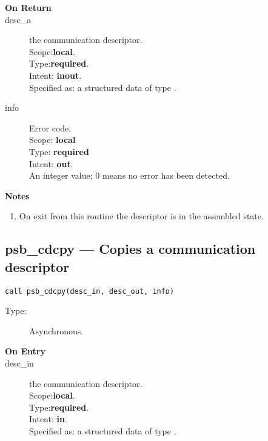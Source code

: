 \begin{description}
\item[\bf On Return]
\item[desc\_a] the communication descriptor.\\
Scope:{\bf local}.\\
Type:{\bf required}.\\
Intent: {\bf inout}.\\
Specified as: a structured data of type \descdata.
\item[info] Error code.\\
Scope: {\bf local} \\
Type: {\bf required} \\
Intent: {\bf out}.\\
An integer value; 0 means no error has been detected. 
\end{description}
{\par\noindent\large\bfseries Notes}
\begin{enumerate}
\item On exit from this routine the descriptor is in the assembled
  state. 
\end{enumerate}



%
%
\clearpage\subsection*{psb\_cdcpy --- Copies a communication descriptor}

\begin{verbatim}
call psb_cdcpy(desc_in, desc_out, info)
\end{verbatim}

\begin{description}
\item[Type:] Asynchronous.
\item[\bf On Entry]
\item[desc\_in] the communication descriptor.\\
Scope:{\bf local}.\\
Type:{\bf required}.\\
Intent: {\bf in}.\\
Specified as: a structured data of type \descdata.

\end{description}

